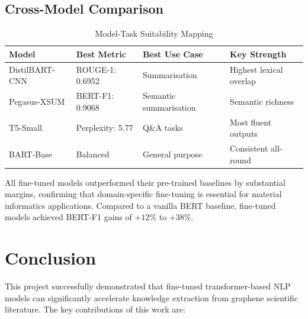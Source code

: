 \documentclass[12pt, a4paper]{report}
\begin{document}
\section{Cross-Model Comparison}

\begin{table}[H]
\centering
\caption{Model-Task Suitability Mapping}
\begin{tabular}{llll}
\toprule
\textbf{Model} & \textbf{Best Metric} & \textbf{Best Use Case} & \textbf{Key Strength} \\
\midrule
DistilBART-CNN & ROUGE-1: 0.6952 & Summarisation & Highest lexical overlap \\
Pegasus-XSUM & BERT-F1: 0.9068 & Semantic summarisation & Semantic richness \\
T5-Small & Perplexity: 5.77 & Q\&A tasks & Most fluent outputs \\
BART-Base & Balanced & General purpose & Consistent all-round \\
\bottomrule
\end{tabular}
\end{table}

All fine-tuned models outperformed their pre-trained baselines by substantial margins, confirming that domain-specific fine-tuning is essential for material informatics applications. Compared to a vanilla BERT baseline, fine-tuned models achieved BERT-F1 gains of $+12\%$ to $+38\%$.

\chapter{Conclusion}

This project successfully demonstrated that fine-tuned transformer-based NLP models can significantly accelerate knowledge extraction from graphene scientific literature. The key contributions of this work are:
\end{document}
